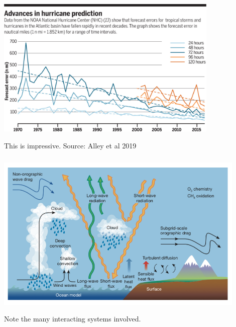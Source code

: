 \documentclass[aspectratio=169]{beamer}
\begin{document}
\begin{frame}
\frametitle{}

\begin{center}
\includegraphics[width = 0.8\textwidth]{figures/alley_advances_2019_fig2}
\end{center}

\vfill
This is impressive. Source: Alley et al 2019

\end{frame}
\begin{frame}
\frametitle{}

\begin{center}
\includegraphics[width = 0.9\textwidth]{figures/bauer_quiet_2015_fig2}
\end{center}

\vfill
Note the many interacting systems involved.

\end{frame}
\end{document}
